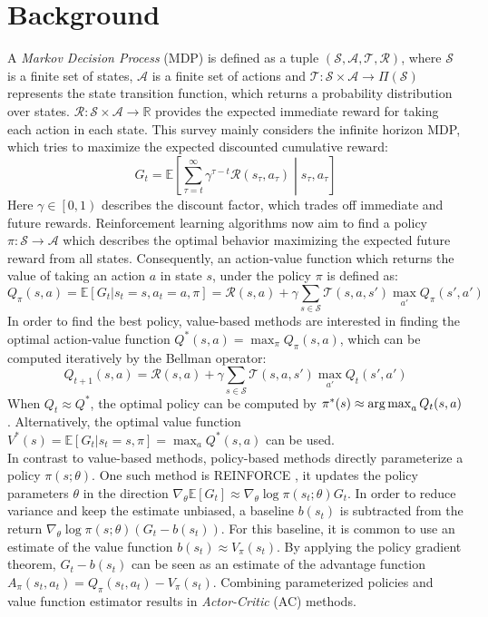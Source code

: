     \section{Background\label{sec:background}}
    A \textit{Markov Decision Process} (MDP) is defined as a tuple $(\mathcal{S}, \mathcal{A}, \mathcal{T},\mathcal{R})$, where $\mathcal{S}$ is a finite set of states, $\mathcal{A}$ is a finite set of actions and $\mathcal{T}:\mathcal{S} \times \mathcal{A} \rightarrow \Pi(\mathcal{S})$ represents the state transition function, which returns a probability distribution over states.
    $\mathcal{R}:\mathcal{S} \times \mathcal{A} \rightarrow \mathbb{R}$ provides the expected immediate reward for taking each action in each state. 
    This survey mainly considers the infinite horizon MDP, which tries to maximize the expected discounted cumulative reward:
    \[
    G_t = \mathbb{E} \left[ \sum_{\tau=t}^{\infty} \gamma^{\tau-t} \mathcal{R}(s_\tau,a_\tau)\middle|s_\tau,a_\tau \right]
	\]
    Here $\gamma \in \left[0,1\right)$ describes the discount factor, which trades off immediate and future rewards.
    Reinforcement learning algorithms now aim to find a policy $\pi:\mathcal{S} \rightarrow \mathcal{A}$ which describes the optimal behavior maximizing the expected future reward from all states.
    Consequently, an action-value function which returns the value of taking an action $a$ in state $s$, under the policy $\pi$ is defined as:
    \[
    Q_\pi(s,a) = \mathbb{E}\left[G_t|s_t =s,a_t=a,\pi\right] = \mathcal{R}(s,a) + \gamma \sum_{s\in\mathcal{S}}\mathcal{T}(s,a,s') \max_{a'}Q_\pi(s',a')
	\]
    In order to find the best policy, value-based methods are interested in finding the optimal action-value function $Q^*(s,a) =\max_\pi Q_\pi(s,a)$, which can be computed iteratively by the Bellman operator:
    \[
	 Q_{t+1}(s,a) = \mathcal{R}(s,a) + \gamma \sum_{s\in\mathcal{S}}\mathcal{T}(s,a,s') \max_{a'}Q_t(s',a')
    \]
    When $Q_t \approx Q^*$, the optimal policy can be computed by $\pi^*(s) \approx \operatorname*{arg\,max}_{a} Q_t(s,a)$.
    Alternatively, the optimal value function $V^*(s) = \mathbb{E}\left[G_t|s_t=s, \pi\right] = \max_{a} Q^*(s,a)$ can be used.\\
    In contrast to value-based methods, policy-based methods directly parameterize a policy $\pi(s;\theta)$. 
    One such method is REINFORCE \cite{Williams1992}, it updates the policy parameters $\theta$ in the direction $\nabla_\theta \mathbb{E}[G_t]\approx \nabla_\theta\log\pi(s_t;\theta)G_t$.
    In order to reduce variance and keep the estimate unbiased, a baseline $b(s_t)$ is subtracted from the return $\nabla_\theta\log\pi(s;\theta)(G_t - b(s_t))$. 
    For this baseline, it is common to use an estimate of the value function $b(s_t)\approx V_\pi(s_t)$.
    By applying the policy gradient theorem, $G_t-b(s_t)$ can be seen as an estimate of the advantage function $A_\pi(s_t,a_t) = Q_\pi(s_t,a_t) - V_\pi(s_t)$.
    Combining parameterized policies and value function estimator results in \textit{Actor-Critic} (AC) methods. 
    
